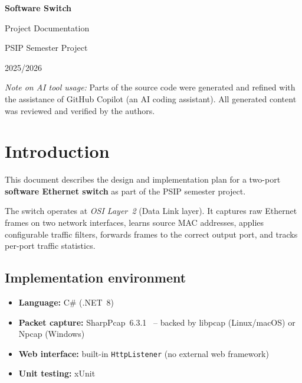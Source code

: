 \documentclass[12pt,a4paper]{article}
\begin{document}

\begin{titlepage}
  \centering
  \vspace*{2cm}
  {\LARGE\bfseries Software Switch\par}
  \vspace{0.5em}
  {\large Project Documentation\par}
  \vspace{3cm}
  {\large PSIP Semester Project\par}
  \vspace{0.5em}
  {\normalsize 2025/2026\par}
  \vfill
  {\small
    \textit{Note on AI tool usage:}
    Parts of the source code were generated and refined with the assistance of
    GitHub Copilot (an AI coding assistant).
    All generated content was reviewed and verified by the authors.
    \par
  }
\end{titlepage}

\tableofcontents
\clearpage

\section{Introduction}

This document describes the design and implementation plan for a two-port
\textbf{software Ethernet switch} as part of the PSIP semester project.

The switch operates at \emph{OSI Layer~2} (Data Link layer).  It captures raw
Ethernet frames on two network interfaces, learns source MAC addresses, applies
configurable traffic filters, forwards frames to the correct output port, and
tracks per-port traffic statistics.

\subsection{Implementation environment}

\begin{itemize}[noitemsep]
  \item \textbf{Language:} C\# (.NET~8)
  \item \textbf{Packet capture:} SharpPcap~6.3.1~\cite{sharppcap} -- backed by
    libpcap (Linux/macOS) or Npcap (Windows)
  \item \textbf{Web interface:} built-in \texttt{HttpListener} (no external web
    framework)
  \item \textbf{Unit testing:} xUnit
\end{itemize}
\end{document}
